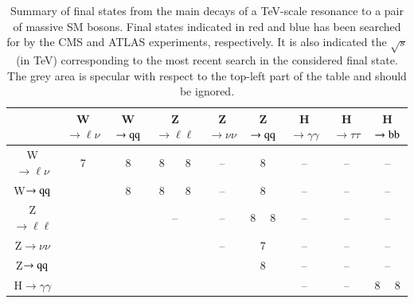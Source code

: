 \documentclass[3p,times,twocolumn]{elsarticle}
\begin{document}
\begin{table}[htbp]
\caption{Summary of final states from the main decays of a TeV-scale
  resonance to a pair of massive SM bosons. Final states indicated in
  red and blue has been searched for by the CMS and ATLAS experiments,
  respectively. It is also indicated the $\sqrt{s}$ (in TeV) corresponding to the most recent
search in the considered final state. The grey area is specular with
respect to the top-left part of the table and should be ignored.}
\centering 
\begin{tabular}{| c | c c c c c c c c c c c |}
\hline
 & W$\rightarrow\ell\nu$ & W$\rightarrow\rm{qq}$ &
 \multicolumn{2}{c}{Z$\rightarrow\ell\ell$} & Z$\rightarrow\nu\nu$ &
 \multicolumn{2}{c}{Z$\rightarrow\rm{qq}$}  & H$\rightarrow\gamma\gamma$ & H$\rightarrow\tau\tau$ & \multicolumn{2}{c|}{H$\rightarrow\rm{bb}$} \\
\hline
W$\rightarrow\ell\nu$ & \multicolumn{1}{c}{\cellcolor{blue!25}7}
&\cellcolor{red!25}8 & \cellcolor{blue!25}8 & \cellcolor{red!25}8 & --
& \multicolumn{2}{c}{\cellcolor{red!25}8} & \multicolumn{1}{c}{--} & -- & \multicolumn{2}{c|}{--} \\
W$\rightarrow\rm{qq}$ & \cellcolor{gray!40} 
& \multicolumn{1}{c}{\cellcolor{red!25}8} & \cellcolor{blue!25}8 &
\cellcolor{red!25}8 & -- & \multicolumn{2}{c}{\cellcolor{red!25}8} & \multicolumn{1}{c}{--} & -- & \multicolumn{2}{c|}{--} \\
Z$\rightarrow\ell\ell$  & \cellcolor{gray!40} &\cellcolor{gray!40}  
& \multicolumn{2}{c}{--} & -- & \cellcolor{blue!25}8 & \cellcolor{red!25}8 & \multicolumn{1}{c}{--} & -- & \multicolumn{2}{c|}{--} \\
Z$\rightarrow\nu\nu$ & \cellcolor{gray!40} & \cellcolor{gray!40}  &
\cellcolor{gray!40} & \cellcolor{gray!40} & \multicolumn{1}{c}{--} & \multicolumn{2}{c}{\cellcolor{red!25}7} & \multicolumn{1}{c}{--} & -- & \multicolumn{2}{c|}{--} \\
Z$\rightarrow\rm{qq}$ & \cellcolor{gray!40} &
\cellcolor{gray!40}&\cellcolor{gray!40}  & \cellcolor{gray!40} & \cellcolor{gray!40}& \multicolumn{2}{c}{\cellcolor{red!25}8} & \multicolumn{1}{c}{--} & -- & \multicolumn{2}{c|}{--} \\
H$\rightarrow\gamma\gamma$ &\cellcolor{gray!40}  &\cellcolor{gray!40}  
& \cellcolor{gray!40} & \cellcolor{gray!40} & \cellcolor{gray!40} &\cellcolor{gray!40} &\cellcolor{gray!40} & \multicolumn{1}{c}{--} &
\multicolumn{1}{c}{--} & \cellcolor{blue!25}8 & \multicolumn{1}{c|}{\cellcolor{red!25}8} \\

\end{tabular}
\end{table}
\end{document}
